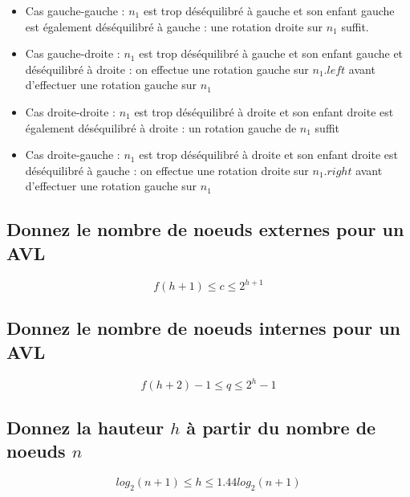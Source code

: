 \documentclass[11pt]{article}
\begin{document}
\begin{itemize}
	\item Cas gauche-gauche : $n_1$ est trop déséquilibré à gauche et son enfant gauche est également déséquilibré à gauche : une rotation droite sur $n_1$ suffit.
	\item Cas gauche-droite : $n_1$ est trop déséquilibré à gauche et son enfant gauche et déséquilibré à droite : on effectue une rotation gauche sur $n_1.left$ avant d'effectuer une rotation gauche sur $n_1$
	\item Cas droite-droite : $n_1$ est trop déséquilibré à droite et son enfant droite est également déséquilibré à droite : un rotation gauche de $n_1$ suffit
	\item Cas droite-gauche : $n_1$ est trop déséquilibré à droite et son enfant droite est déséquilibré à gauche : on effectue une rotation droite sur $n_1.right$ avant d'effectuer une rotation gauche sur $n_1$
\end{itemize}

\subsection{Donnez le nombre de noeuds externes pour un AVL}

\begin{equation}
	f(h + 1) \leq c \leq 2^{h+1}
\end{equation}

\subsection{Donnez le nombre de noeuds internes pour un AVL}

\begin{equation}
	f(h + 2) - 1 \leq q \leq 2^h - 1  
\end{equation}

\subsection{Donnez la hauteur $h$ à partir du nombre de noeuds $n$}

\begin{equation}
	log_2{(n + 1)} \leq h \leq 1.44 log_2{(n + 1)}
\end{equation}
\end{document}
